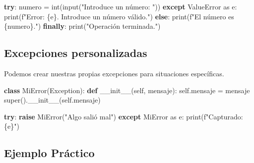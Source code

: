 \documentclass[
  a4paper,
  DIV=11,
  numbers=noendperiod,
  onepage,
  openany]{scrreprt}
\newenvironment{Shaded}{\begin{snugshade}}{\end{snugshade}}
\newcommand{\BuiltInTok}[1]{\textcolor[rgb]{0.00,0.23,0.31}{#1}}
\newcommand{\ControlFlowTok}[1]{\textcolor[rgb]{0.00,0.23,0.31}{\textbf{#1}}}
\newcommand{\FunctionTok}[1]{\textcolor[rgb]{0.28,0.35,0.67}{#1}}
\newcommand{\ImportTok}[1]{\textcolor[rgb]{0.00,0.46,0.62}{#1}}
\newcommand{\KeywordTok}[1]{\textcolor[rgb]{0.00,0.23,0.31}{\textbf{#1}}}
\newcommand{\NormalTok}[1]{\textcolor[rgb]{0.00,0.23,0.31}{#1}}
\newcommand{\OperatorTok}[1]{\textcolor[rgb]{0.37,0.37,0.37}{#1}}
\newcommand{\PreprocessorTok}[1]{\textcolor[rgb]{0.68,0.00,0.00}{#1}}
\newcommand{\SpecialCharTok}[1]{\textcolor[rgb]{0.37,0.37,0.37}{#1}}
\newcommand{\SpecialStringTok}[1]{\textcolor[rgb]{0.13,0.47,0.30}{#1}}
\newcommand{\StringTok}[1]{\textcolor[rgb]{0.13,0.47,0.30}{#1}}
\newcommand{\VariableTok}[1]{\textcolor[rgb]{0.07,0.07,0.07}{#1}}
\begin{document}
\begin{Shaded}
\begin{Highlighting}[]
\ControlFlowTok{try}\NormalTok{:}
\NormalTok{    numero }\OperatorTok{=} \BuiltInTok{int}\NormalTok{(}\BuiltInTok{input}\NormalTok{(}\StringTok{"Introduce un número: "}\NormalTok{))}
\ControlFlowTok{except} \PreprocessorTok{ValueError} \ImportTok{as}\NormalTok{ e:}
    \BuiltInTok{print}\NormalTok{(}\SpecialStringTok{f"Error: }\SpecialCharTok{\{}\NormalTok{e}\SpecialCharTok{\}}\SpecialStringTok{. Introduce un número válido."}\NormalTok{)}
\ControlFlowTok{else}\NormalTok{:}
    \BuiltInTok{print}\NormalTok{(}\SpecialStringTok{f"El número es }\SpecialCharTok{\{}\NormalTok{numero}\SpecialCharTok{\}}\SpecialStringTok{."}\NormalTok{)}
\ControlFlowTok{finally}\NormalTok{:}
    \BuiltInTok{print}\NormalTok{(}\StringTok{"Operación terminada."}\NormalTok{)}
\end{Highlighting}
\end{Shaded}

\subsection{Excepciones
personalizadas}\label{excepciones-personalizadas}

Podemos crear nuestras propias excepciones para situaciones específicas.

\begin{Shaded}
\begin{Highlighting}[]
\KeywordTok{class}\NormalTok{ MiError(}\PreprocessorTok{Exception}\NormalTok{):}
    \KeywordTok{def} \FunctionTok{\_\_init\_\_}\NormalTok{(}\VariableTok{self}\NormalTok{, mensaje):}
        \VariableTok{self}\NormalTok{.mensaje }\OperatorTok{=}\NormalTok{ mensaje}
        \BuiltInTok{super}\NormalTok{().}\FunctionTok{\_\_init\_\_}\NormalTok{(}\VariableTok{self}\NormalTok{.mensaje)}

\ControlFlowTok{try}\NormalTok{:}
    \ControlFlowTok{raise}\NormalTok{ MiError(}\StringTok{"Algo salió mal"}\NormalTok{)}
\ControlFlowTok{except}\NormalTok{ MiError }\ImportTok{as}\NormalTok{ e:}
    \BuiltInTok{print}\NormalTok{(}\SpecialStringTok{f"Capturado: }\SpecialCharTok{\{}\NormalTok{e}\SpecialCharTok{\}}\SpecialStringTok{"}\NormalTok{)}
\end{Highlighting}
\end{Shaded}

\subsection{Ejemplo Práctico}\label{ejemplo-pruxe1ctico-1}
\end{document}
